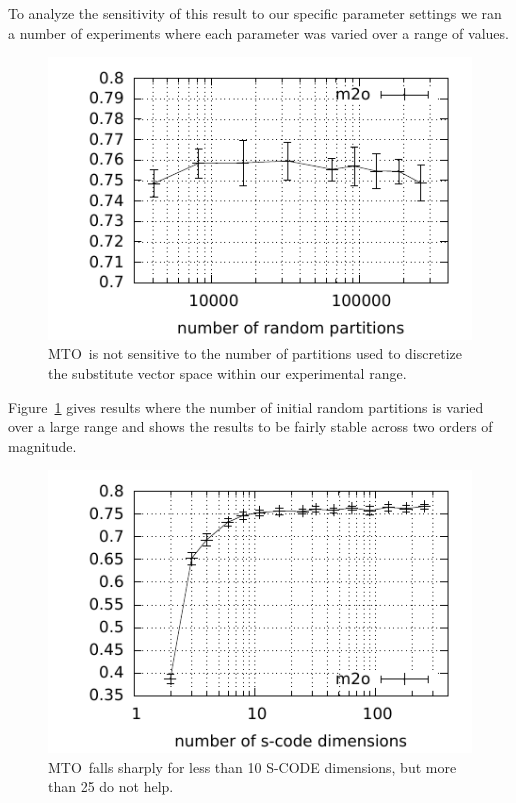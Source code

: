 \documentclass[11pt]{article}
\newcommand{\mto}{\mbox{MTO }}
\begin{document}
To analyze the sensitivity of this result to our specific parameter
settings we ran a number of experiments where each parameter was
varied over a range of values.

\begin{figure}[ht] \centering
\includegraphics[width=\linewidth]{plot-p.pdf}
\caption{\mto is not sensitive to the number of partitions used to
  discretize the substitute vector space within our experimental
  range.}
\label{plot-p}
\end{figure}

Figure~\ref{plot-p} gives results where the number of initial random
partitions is varied over a large range and shows the results to be
fairly stable across two orders of magnitude.

\begin{figure}[ht] \centering
\includegraphics[width=\linewidth]{plot-d.pdf}
\caption{\mto falls sharply for less than 10 S-CODE dimensions, but
  more than 25 do not help.}
\label{plot-d}
\end{figure}
\end{document}

